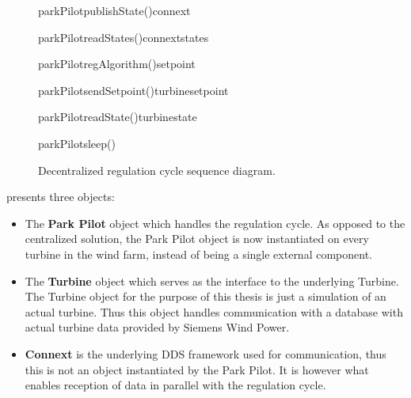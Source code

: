 \begin{figure}[!h]
	\centering
	\begin{sequencediagram} %
		
		\begin {messcall}{parkPilot}{publishState()}{connext}{}
		\end {messcall}
		\begin {call}{parkPilot}{readStates()}{connext}{states}
		\end {call}
		\begin {callself}{parkPilot}{regAlgorithm()}{setpoint}
		\end {callself}
		\begin {call}{parkPilot}{sendSetpoint()}{turbine}{setpoint}
		\end {call}
		\begin {call}{parkPilot}{readState()}{turbine}{state}
		\end {call}	
		\begin {callself}{parkPilot}{sleep()}{}
		\end {callself}			
	\end{sequencediagram}

	\caption[Decentralized regulation cycle sequence diagram]{
		\label{fig:decenRegCycle} 
		\footnotesize{%
			Decentralized regulation cycle sequence diagram.
		}
	}
\end{figure}

 presents three objects:

\begin{itemize}
	\item The \textbf{Park Pilot} object which handles the regulation cycle. As opposed to the centralized solution, the Park Pilot object is now instantiated on every turbine in the wind farm, instead of being a single external component.
	\item The \textbf{Turbine} object which serves as the interface to the underlying Turbine. The Turbine object for the purpose of this thesis is just a simulation of an actual turbine. Thus this object handles communication with a database with actual turbine data provided by Siemens Wind Power.
	\item \textbf{Connext} is the underlying DDS framework used for communication, thus this is not an object instantiated by the Park Pilot. It is however what enables reception of data in parallel with the regulation cycle. 
\end{itemize}

